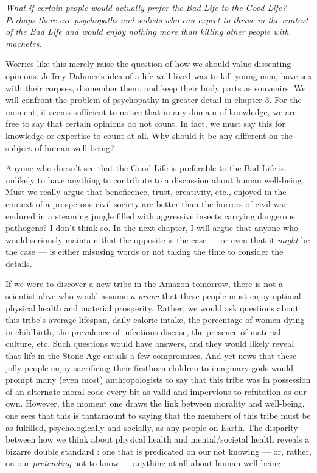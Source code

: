 \documentclass[a4paper,14pt]{extarticle}
\begin{document}
\textit{What if certain people would actually prefer the Bad Life to the Good Life?
      Perhaps there are psychopaths and sadists who can expect to thrive in the context of the Bad Life and would enjoy nothing more than killing other people with machetes.}

Worries like this merely raise the question of how we should value dissenting opinions.
Jeffrey Dahmer's idea of a life well lived was to kill young men, have sex with their corpses, dismember them, and keep their body parts as souvenirs.
We will confront the problem of psychopathy in greater detail in chapter 3.
For the moment, it seems sufficient to notice that in any domain of knowledge, we are free to say that certain opinions do not count.
In fact, we must say this for knowledge or expertise to count at all.
Why should it be any different on the subject of human well-being?

Anyone who doesn't see that the Good Life is preferable to the Bad Life is unlikely to have anything to contribute to a discussion about human well-being.
Must we really argue that beneficence, trust, creativity, etc., enjoyed in the context of a prosperous civil society are better than the horrors of civil war endured in a steaming jungle filled with aggressive insects carrying dangerous pathogens?
I don't think so.
In the next chapter, I will argue that anyone who would seriously maintain that the opposite is the case --- or even that it \textit{might} be the case --- is either misusing words or not taking the time to consider the details.

If we were to discover a new tribe in the Amazon tomorrow, there is not a scientist alive who would assume \textit{a priori} that these people must enjoy optimal physical health and material prosperity.
Rather, we would ask questions about this tribe's average lifespan, daily calorie intake, the percentage of women dying in childbirth, the prevalence of infectious disease, the presence of material culture, etc.
Such questions would have answers, and they would likely reveal that life in the Stone Age entails a few compromises.
And yet news that these jolly people enjoy sacrificing their firstborn children to imaginary gods would prompt many (even most) anthropologists to say that this tribe was in possession of an alternate moral code every bit as valid and impervious to refutation as our own.
However, the moment one draws the link between morality and well-being, one sees that this is tantamount to saying that the members of this tribe must be as fulfilled, psychologically and socially, as any people on Earth.
The disparity between how we think about physical health and mental/societal health reveals a bizarre double standard :
one that is predicated on our not knowing --- or, rather, on our \textit{pretending} not to know --- anything at all about human well-being.
\end{document}
